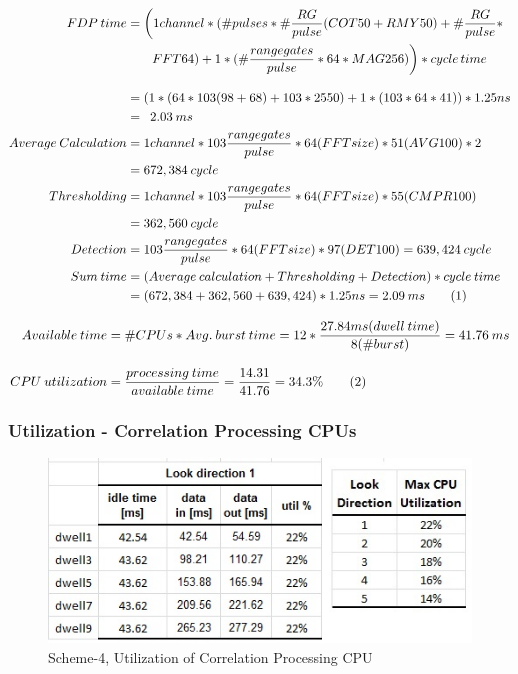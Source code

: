\begin{align*}
	FDP \: time &= \bigg(1channel * (\#pulses * \# \frac{RG}{pulse} (COT50 + RMY50) + \# \frac{RG}{pulse} * \\
		& \qquad FFT64) + 1 * (\# \frac{range gates}{pulse} * 64 * MAG256)\bigg) * cycle \, time \\[0.3cm]
		&= (1 * (64 * 103 (98 + 68) + 103 * 2550) + 1 * (103 * 64 * 41)) * 1.25ns \\
		&= \enspace 2.03 \: ms \\
		Average \: Calculation &= 1channel * 103 \frac{range gates}{pulse} * 64(FFTsize) * 51(AVG100) * 2 \\
		&=  672,384 \: cycle \\
		Thresholding &= 1channel * 103 \frac{range gates}{pulse} * 64(FFTsize) * 55(CMPR100) \\
		&= 362,560 \: cycle \\
		Detection &= 103 \frac{range gates}{pulse} * 64(FFTsize) * 97(DET100) = 639,424 \: cycle \\
		Sum \: time &= (Average \: calculation + Thresholding + Detection) * cycle \: time \\
		&= (672,384 + 362,560 + 639,424) * 1.25ns = 2.09 \: ms	\stepcounter{equation}\tag{\theequation} 
\end{align*}

\begin{align*}
	Available \: time &= \#CPUs * Avg. \: burst \: time = 12 * \frac{27.84ms (dwell \: time)}{8(\#burst)} = 41.76 \: ms\\[0.3cm]
	CPU \: utilization &= \frac{processing \: time}{available \: time} = \frac{14.31}{41.76} = 34.3\% \stepcounter{equation}\tag{\theequation} 
\end{align*}


\subsubsection{Utilization - Correlation Processing CPUs}
\begin{figure}[h!]
	\centering
	\includegraphics[]{figures/scheme5_mul_cpu_util}
	\caption{Scheme-4, Utilization of Correlation Processing CPU}
	\label{fig:mm:scheme5_mul_cpu_util}
\end{figure}

